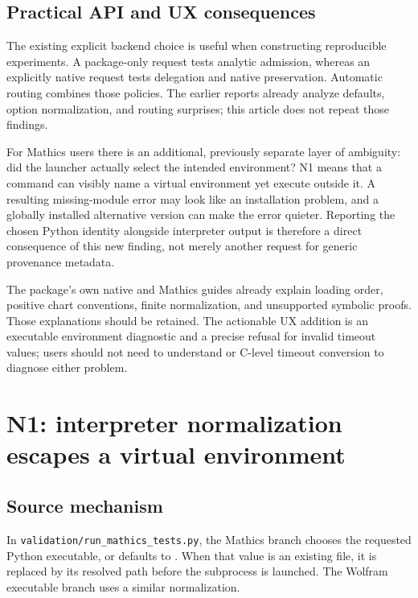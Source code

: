\documentclass[11pt,letterpaper]{article}
\newcommand{\code}[1]{\texttt{\detokenize{#1}}}
\newcommand{\file}[1]{\nolinkurl{#1}}
\begin{document}
\subsection{Practical API and UX consequences}

The existing explicit backend choice is useful when constructing reproducible experiments. A package-only request tests analytic admission, whereas an explicitly native request tests delegation and native preservation. Automatic routing combines those policies. The earlier reports already analyze defaults, option normalization, and routing surprises; this article does not repeat those findings.~\cite{wave3,nativecontracts}

For Mathics users there is an additional, previously separate layer of ambiguity: did the launcher actually select the intended environment? N1 means that a command can visibly name a virtual environment yet execute outside it. A resulting missing-module error may look like an installation problem, and a globally installed alternative version can make the error quieter. Reporting the chosen Python identity alongside interpreter output is therefore a direct consequence of this new finding, not merely another request for generic provenance metadata.

The package's own native and Mathics guides already explain loading order, positive chart conventions, finite normalization, and unsupported symbolic proofs. Those explanations should be retained. The actionable UX addition is an executable environment diagnostic and a precise refusal for invalid timeout values; users should not need to understand \code{Path.resolve} or C-level timeout conversion to diagnose either problem.~\cite{mathicsguide,runner}

\section{N1: interpreter normalization escapes a virtual environment}
\label{sec:n1}

\subsection{Source mechanism}

In \file{validation/run_mathics_tests.py}, the Mathics branch chooses the requested Python executable, or defaults to \code{sys.executable}. When that value is an existing file, it is replaced by its resolved path before the subprocess is launched. The Wolfram executable branch uses a similar normalization.~\cite{runner}
\end{document}
